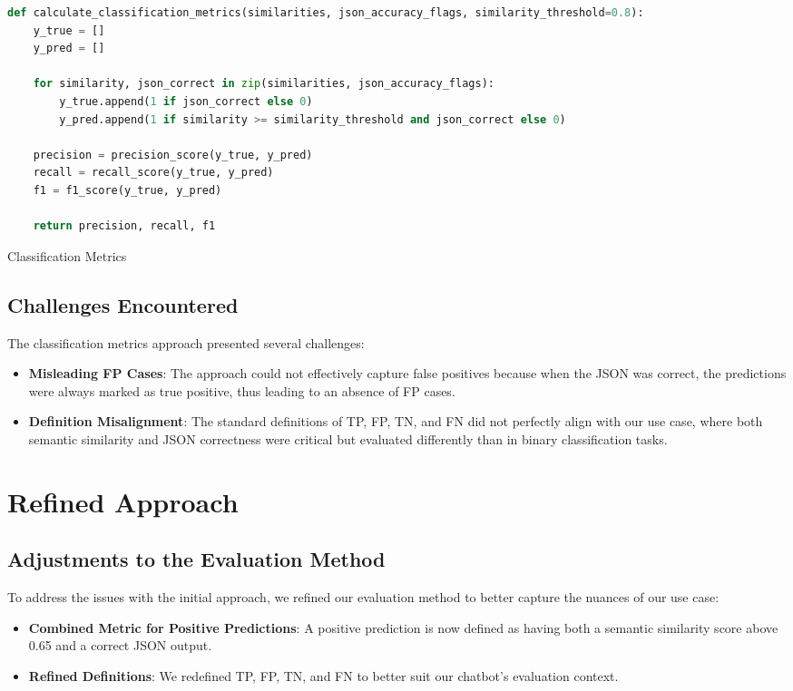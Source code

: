 \begin{Listing}
    \begin{lstlisting}[language=Python]
def calculate_classification_metrics(similarities, json_accuracy_flags, similarity_threshold=0.8):
    y_true = []
    y_pred = []

    for similarity, json_correct in zip(similarities, json_accuracy_flags):
        y_true.append(1 if json_correct else 0)
        y_pred.append(1 if similarity >= similarity_threshold and json_correct else 0)

    precision = precision_score(y_true, y_pred)
    recall = recall_score(y_true, y_pred)
    f1 = f1_score(y_true, y_pred)

    return precision, recall, f1
  \end{lstlisting}
    \caption{Classification Metrics}
    \label{lst:evalMetrics2}
\end{Listing}

\subsection{Challenges Encountered}

The classification metrics approach presented several challenges:
\begin{itemize}
    \item \textbf{Misleading FP Cases}: The approach could not effectively capture false positives because when the JSON was correct, the predictions were always marked as true positive, thus leading to an absence of FP cases.
    \item \textbf{Definition Misalignment}: The standard definitions of TP, FP, TN, and FN did not perfectly align with our use case, where both semantic similarity and JSON correctness were critical but evaluated differently than in binary classification tasks.
\end{itemize}

\section{Refined Approach}

\subsection{Adjustments to the Evaluation Method}

To address the issues with the initial approach, we refined our evaluation method to better capture the nuances of our use case:
\begin{itemize}
    \item \textbf{Combined Metric for Positive Predictions}: A positive prediction is now defined as having both a semantic similarity score above 0.65 and a correct JSON output.
    \item \textbf{Refined Definitions}: We redefined TP, FP, TN, and FN to better suit our chatbot's evaluation context.
\end{itemize}

